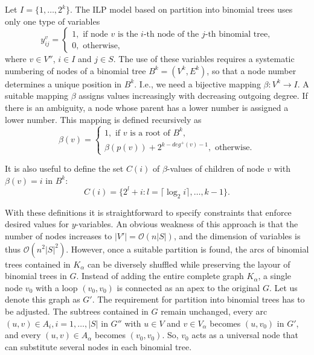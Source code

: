 Let $I=\{1,\dots,2^k\}$.
The ILP model based on partition into binomial trees uses only one type of variables
$$
y_{ij}^v=\begin{cases}
1, \text{ if  node } v \text{ is the } i\text{-th node of the } j \text{-th binomial tree,}\\
0, \text{ otherwise},
\end{cases}
$$
where $v\in V''$, $i\in I$ and $j\in S$. 
The use of these variables requires a systematic numbering of nodes of a binomial tree $B^k=(V^k,E^k)$, so that a node number determines a unique position in $B^k$.
I.e., we need a bijective mapping $\beta: V^k \to I$.
A suitable mapping $\beta$ assigns values increasingly with decreasing outgoing degree. 
If there is an ambiguity, a node whose parent has a lower number is assigned a lower number.
This mapping is defined recursively as
\begin{equation}
\label{eq:beta}
\beta(v)=\begin{cases}
1,\text{ if } v \text{ is a root of } B^k,\\
\beta(p(v)) + 2^{k-deg^+(v)-1}, \text{ otherwise}.
\end{cases}
\end{equation}

It is also useful to define the set $C(i)$ of $\beta$-values of children of node $v$ with $\beta(v)=i$ in $B^k$:
\begin{equation}
C(i)=\{2^l+i:l=\lceil\log_2 i\rceil,\dots,k-1\}.
\end{equation}

With these definitions it is straightforward to specify constraints that enforce desired values for $y$-variables.
An obvious weakness of this approach is  that the number of nodes increases to $|V'|=\mathcal{O}(n|S|)$, and the dimension of variables is thus $\mathcal{O}(n^2|S|^2)$.
However, once a suitable partition is found, the arcs of binomial trees contained in $K_\alpha$ can be diversely shuffled while preserving the layour of binomial trees in $G$.
Instead of adding the entire complete graph $K_\alpha$, a single node $v_0$ with a loop $(v_0,v_0)$ is connected as an apex to the original $G$.
Let us denote this graph as $G'$.
The requirement for partition into binomial trees has to be adjusted.
The subtrees contained in $G$ remain unchanged, every arc $(u,v)\in A_i, i=1,\dots,|S|$ in $G''$ with $u\in V$ and $v\in V_\alpha$ becomes $(u,v_0)$ in $G'$,
and every $(u,v)\in A_\alpha$ becomes $(v_0,v_0)$.
So, $v_0$ acts as a universal node that can substitute several nodes in each binomial tree.

